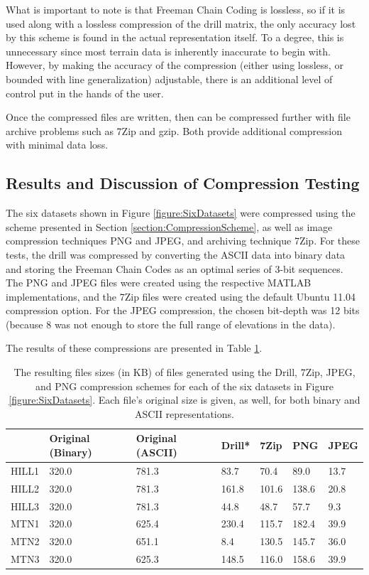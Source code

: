 What is important to note is that Freeman Chain Coding is lossless, so if it is used along with a lossless compression of the drill matrix, the only accuracy lost by this scheme is found in the actual representation itself. To a degree, this is unnecessary since most terrain data is inherently inaccurate to begin with. However, by making the accuracy of the compression (either using lossless, or bounded with line generalization) adjustable, there is an additional level of control put in the hands of the user.

Once the compressed files are written, then can be compressed further with file archive problems such as 7Zip \cite{7z-Pavlov} and gzip. Both provide additional compression with minimal data loss.

\subsection{Results and Discussion of Compression Testing}

The six datasets shown in Figure \ref{figure:SixDatasets} were compressed using the scheme presented in Section \ref{section:CompressionScheme}, as well as image compression techniques PNG and JPEG, and archiving technique 7Zip.
For these tests, the drill was compressed by converting the ASCII data into binary data and storing the Freeman Chain Codes as an optimal series of 3-bit sequences.
The PNG and JPEG files were created using the respective MATLAB implementations, and the 7Zip files were created using the default Ubuntu 11.04 compression option. For the JPEG compression, the chosen bit-depth was 12 bits (because 8 was not enough to store the full range of elevations in the data).

The results of these compressions are presented in Table \ref{table:CompressionResults}.

\begin{table}[t]
  \centering
    \begin{tabular}{| l | l | l | l | l | l | l |}
      \hline
      & Original (Binary) & Original (ASCII) & Drill* & 7Zip & PNG & JPEG \\
      \hline
      HILL1 & 320.0 & 781.3 & 83.7 & 70.4 & 89.0 & 13.7 \\
      \hline
      HILL2 & 320.0 & 781.3 & 161.8 & 101.6 & 138.6 & 20.8 \\
      \hline
      HILL3 & 320.0 & 781.3 & 44.8 & 48.7 & 57.7 & 9.3 \\
      \hline
      MTN1 & 320.0 & 625.4 & 230.4 & 115.7 & 182.4 & 39.9 \\
      \hline
      MTN2 & 320.0 & 651.1 & 8.4 & 130.5 & 145.7 & 36.0 \\
      \hline
      MTN3 & 320.0 & 625.3 & 148.5 & 116.0 & 158.6 & 39.9 \\
      \hline
    \end{tabular}
  \caption[Results for compression scheme tests.]{\label{table:CompressionResults} The resulting files sizes (in KB) of files generated using the Drill, 7Zip, JPEG, and PNG compression schemes for each of the six datasets in Figure \ref{figure:SixDatasets}. Each file's original size is given, as well, for both binary and ASCII representations.}
\end{table}

